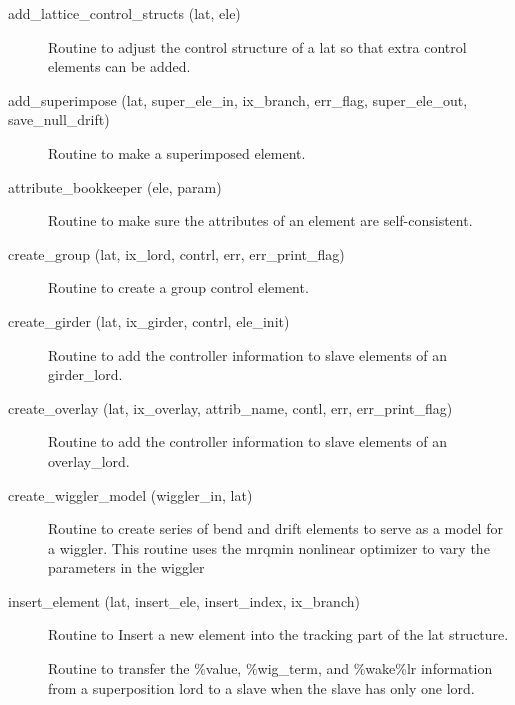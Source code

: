\begin{description}

\label{r:add.lattice.control.structs}
\item[add_lattice_control_structs (lat, ele)] \Newline 
Routine to adjust the control structure of a lat so that extra control
elements can be added.

\label{r:add.superimpose}
\item[add_superimpose (lat, super_ele_in, ix_branch, err_flag, super_ele_out, save_null_drift)] \Newline
Routine to make a superimposed element. 

\label{r:attribute.bookkeeper}
\item[attribute_bookkeeper (ele, param)] \Newline
Routine to make sure the attributes of an element are self-consistent. 

\label{r:create.group}
\item[create_group (lat, ix_lord, contrl, err, err_print_flag)] \Newline
Routine to create a group control element. 

\label{r:create.girder}
\item[create_girder (lat, ix_girder, contrl, ele_init)] \Newline 
     Routine to add the controller information to slave elements of
     an girder_lord.

\label{r:create.overlay}
\item[create_overlay (lat, ix_overlay, attrib_name, contl, err, err_print_flag)] \Newline
Routine to add the controller information to slave elements of an 
overlay_lord. 

\label{r:create.wiggler.model}
\item[create_wiggler_model (wiggler_in, lat)] \Newline 
Routine to create series of bend and drift elements to serve as a model for a wiggler.
This routine uses the mrqmin nonlinear optimizer to vary the parameters in the wiggler 

\label{r:insert.element}
\item[insert_element (lat, insert_ele, insert_index, ix_branch)] \Newline
Routine to Insert a new element into the tracking part of the 
lat structure. 

\label{r:create.element.slice}
\item[\protect\parbox{6in}{
    create_element_slice (sliced_ele, ele_in, l_slice, offset, \\
    \hspace*{1in} param, at_entrance_end, at_exit_end, err_flag)} ] \Newline 
Routine to transfer the \%value, \%wig_term, and \%wake\%lr information from a 
superposition lord to a slave when the slave has only one lord.


\end{description}
